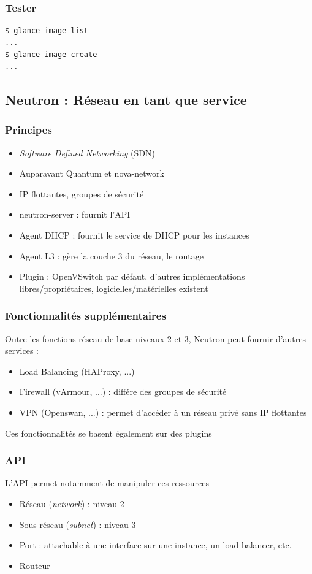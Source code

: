   \begin{frame}[containsverbatim]
    \frametitle{Tester}
\begin{verbatim}
$ glance image-list
...
$ glance image-create
...
\end{verbatim}
  \end{frame}

  \subsection[Neutron]{Neutron : Réseau en tant que service}

  \begin{frame}
    \frametitle{Principes}
    \begin{itemize}
      \item \textit{Software Defined Networking} (SDN)
      \item Auparavant Quantum et nova-network
      \item IP flottantes, groupes de sécurité
      \item neutron-server : fournit l'API
      \item Agent DHCP : fournit le service de DHCP pour les instances
      \item Agent L3 : gère la couche 3 du réseau, le routage
      \item Plugin : OpenVSwitch par défaut, d'autres implémentations libres/propriétaires, logicielles/matérielles existent
    \end{itemize}
  \end{frame}

  \begin{frame}
    \frametitle{Fonctionnalités supplémentaires}
    Outre les fonctions réseau de base niveaux 2 et 3, Neutron peut fournir d'autres services :
    \begin{itemize}
      \item Load Balancing (HAProxy, ...)
      \item Firewall (vArmour, ...) : différe des groupes de sécurité
      \item VPN (Openswan, ...) : permet d'accéder à un réseau privé sans IP flottantes
    \end{itemize}
    Ces fonctionnalités se basent également sur des plugins
  \end{frame}

  \begin{frame}
    \frametitle{API}
    L'API permet notamment de manipuler ces ressources
    \begin{itemize}
      \item Réseau (\textit{network}) : niveau 2
      \item Sous-réseau (\textit{subnet}) : niveau 3
      \item Port : attachable à une interface sur une instance, un load-balancer, etc.
      \item Routeur
    \end{itemize}
  \end{frame}

